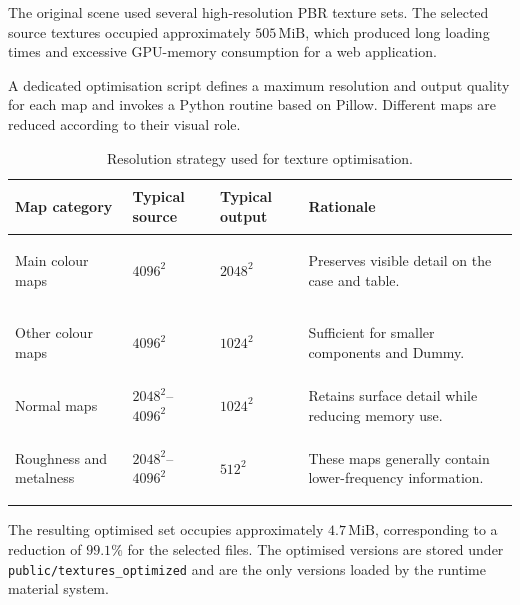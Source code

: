 \documentclass{report}
\begin{document}
The original scene used several high-resolution PBR texture sets. The
selected source textures occupied approximately \(505\,\mathrm{MiB}\),
which produced long loading times and excessive GPU-memory consumption
for a web application.

A dedicated optimisation script defines a maximum resolution and output
quality for each map and invokes a Python routine based on Pillow.
Different maps are reduced according to their visual role.

\begin{table}[ht]
    \centering
    \small
    \setlength{\tabcolsep}{6pt}
    \renewcommand{\arraystretch}{1.2}

    \begin{tabularx}{\textwidth}{
        @{}
        >{\bfseries\raggedright\arraybackslash}p{}
        >{\centering\arraybackslash}p{}
        >{\centering\arraybackslash}p{}
        >{\raggedright\arraybackslash}X
        @{}
    }
        \toprule
        Map category & Typical source & Typical output & Rationale \\
        \midrule

        Main colour maps
        &
        \(4096^2\)
        &
        \(2048^2\)
        &
        Preserves visible detail on the case and table.
        \\

        Other colour maps
        &
        \(4096^2\)
        &
        \(1024^2\)
        &
        Sufficient for smaller components and Dummy.
        \\

        Normal maps
        &
        \(2048^2\)--\(4096^2\)
        &
        \(1024^2\)
        &
        Retains surface detail while reducing memory use.
        \\

        Roughness and metalness
        &
        \(2048^2\)--\(4096^2\)
        &
        \(512^2\)
        &
        These maps generally contain lower-frequency information.
        \\

        \bottomrule
    \end{tabularx}

    \caption{Resolution strategy used for texture optimisation.}
    \label{tab:texture-optimisation-strategy}
\end{table}

The resulting optimised set occupies approximately
\(4.7\,\mathrm{MiB}\), corresponding to a reduction of \(99.1\%\) for
the selected files. The optimised versions are stored under
\texttt{public/textures\_optimized} and are the only versions loaded by
the runtime material system.
\end{document}
